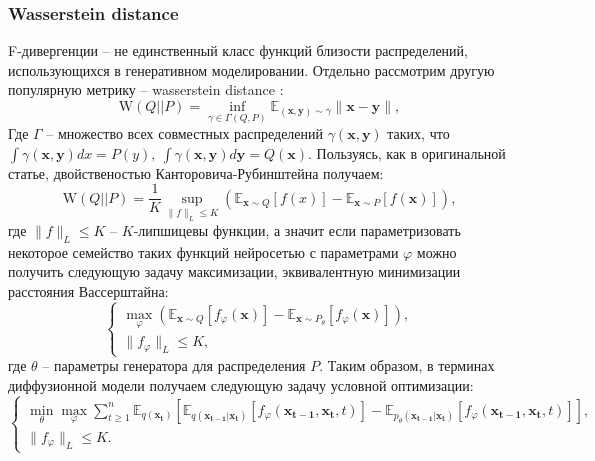 \documentclass{article}
\begin{document}
\subsubsection{Wasserstein distance}
F-дивергенции -- не единственный класс функций близости распределений, использующихся в генеративном моделировании. Отдельно рассмотрим другую популярную метрику -- wasserstein distance \cite{https://doi.org/10.48550/arxiv.1701.07875, DBLP:journals/corr/GulrajaniAADC17}:
\begin{equation}
	\text{W}(Q||P) = \inf\limits_{\gamma \in \Gamma(Q,P)} \mathbb{E}_{(\mathbf{x},\mathbf{y})\sim \gamma} \|\mathbf{x}-\mathbf{y}\|,
\end{equation}
Где $\Gamma$ -- множество всех совместных распределений  $\gamma(\mathbf{x},\mathbf{y})$ таких, что $\int \gamma(\mathbf{x},\mathbf{y}) dx = P(y),~\int \gamma(\mathbf{x},\mathbf{y}) d\mathbf{y} = Q(\mathbf{x})$. Пользуясь, как в оригинальной статье, двойственостью Канторовича-Рубинштейна получаем:
\begin{equation}
	\text{W}(Q||P) = \frac{1}{K}\sup\limits_{\|f\|_L\leqslant K}\left( \mathbb{E}_{\mathbf{x}\sim Q} [f(x)] - \mathbb{E}_{\mathbf{x}\sim P} [f(\mathbf{x})]\right),
\end{equation}
где $\|f\|_L\leqslant K$ -- $K$-липшицевы функции, а значит если параметризовать некоторое семейство таких функций нейросетью с параметрами $\varphi$ можно получить следующую задачу максимизации, эквивалентную минимизации расстояния Вассерштайна:
\begin{equation}
	\begin{cases}
	\max\limits_{\varphi}\left(\mathbb{E}_{\mathbf{x}\sim Q} [f_\varphi(\mathbf{x})] - \mathbb{E}_{\mathbf{x}\sim P_\theta} [f_\varphi(\mathbf{x})]\right),\\
		\|f_\varphi\|_L \leqslant K,
\end{cases}
\end{equation}
где $\theta$ -- параметры генератора для распределения $P$. Таким образом, в терминах диффузионной модели получаем следующую задачу условной оптимизации:
\begin{equation}
	\begin{cases}
	\min\limits_\theta\max\limits_\varphi\sum\limits_{t\geqslant 1}^n \mathbb{E}_{q(\mathbf{x_t})}\left[\mathbb{E}_{q(\mathbf{x_{t-1}}|\mathbf{x_t})}\left[f_\varphi(\mathbf{x_{t-1}}, \mathbf{x_t}, t)\right] - \mathbb{E}_{p_\theta(\mathbf{x_{t-1}}|\mathbf{x_t})}\left[f_\varphi(\mathbf{x_{t-1}}, \mathbf{x_t}, t)\right]\right],\\
	\|f_\varphi\|_L \leqslant K.
	\end{cases}
\end{equation}\\
\end{document}
